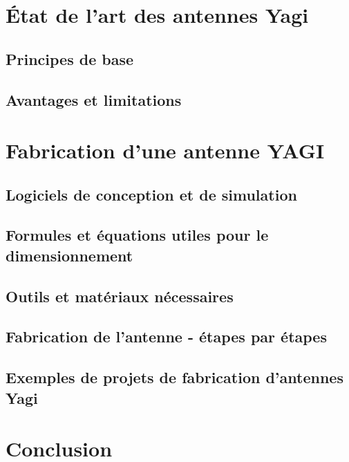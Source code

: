 \documentclass[12pt, a4paper]{article}
\begin{document}
\section{État de l'art des antennes Yagi}
\subsection{Principes de base}

\subsection{Avantages et limitations}




\section{Fabrication d'une antenne YAGI}
\subsection{Logiciels de conception et de simulation}

\subsection{Formules et équations utiles pour le dimensionnement}

\subsection{Outils et matériaux nécessaires}

\subsection{Fabrication de l'antenne - étapes par étapes}

\subsection{Exemples de projets de fabrication d'antennes Yagi}






\section{Conclusion}



\end{document}

